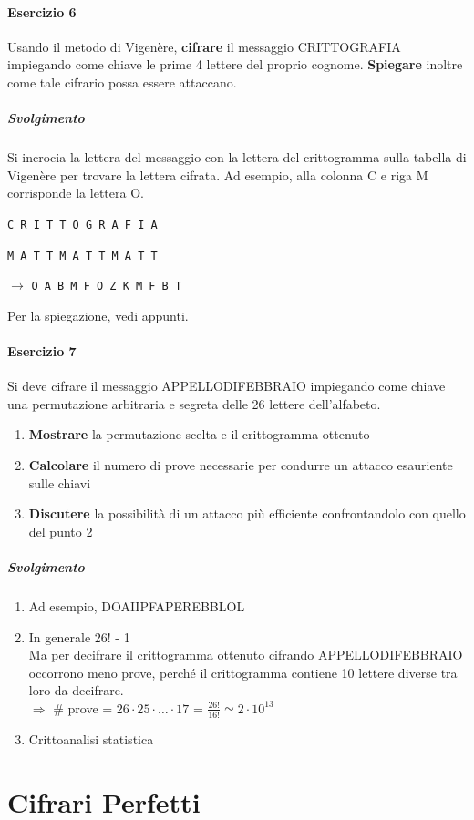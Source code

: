 \documentclass[10pt]{book}
\begin{document}
\paragraph{Esercizio 6} Usando il metodo di Vigenère, \textbf{cifrare} il messaggio CRITTOGRAFIA impiegando come chiave le prime 4 lettere del proprio cognome. \textbf{Spiegare} inoltre come tale cifrario possa essere attaccano.
\subparagraph{Svolgimento} Si incrocia la lettera del messaggio con la lettera del crittogramma sulla tabella di Vigenère per trovare la lettera cifrata. Ad esempio, alla colonna C e riga M corrisponde la lettera O.
\begin{list}{}{}
	\item \texttt{C R I T T O G R A F I A}
	\item \texttt{M A T T M A T T M A T T}
	\item[$\rightarrow$] \texttt{O A B M F O Z K M F B T}
\end{list}
Per la spiegazione, vedi appunti.
\paragraph{Esercizio 7}
Si deve cifrare il messaggio APPELLODIFEBBRAIO impiegando come chiave una permutazione
arbitraria e segreta delle 26 lettere dell’alfabeto.
\begin{enumerate}
	\item \textbf{Mostrare} la permutazione scelta e il crittogramma ottenuto
	\item \textbf{Calcolare} il numero di prove necessarie per condurre un attacco esauriente sulle chiavi
	\item \textbf{Discutere} la possibilità di un attacco più efficiente confrontandolo con quello del punto 2
\end{enumerate}
\subparagraph{Svolgimento}
\begin{enumerate}
	\item Ad esempio, DOAIIPFAPEREBBLOL
	\item In generale 26! - 1\\
	Ma per decifrare il crittogramma ottenuto cifrando APPELLODIFEBBRAIO occorrono meno prove, perché il crittogramma contiene 10 lettere diverse tra loro da decifrare.\\
	$\Rightarrow$ \# prove = $26\cdot25\cdot\ldots\cdot17$ = $\frac{26!}{16!} \simeq 2\cdot10^{13}$
	\item Crittoanalisi statistica
\end{enumerate}
\section{Cifrari Perfetti}
\end{document}
